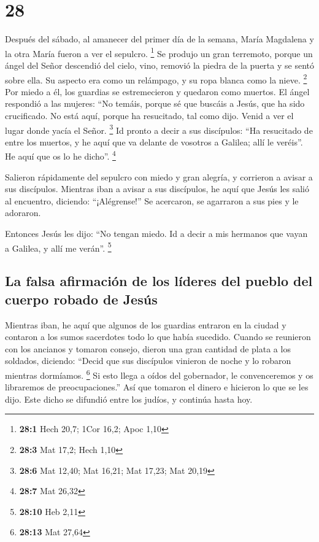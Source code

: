 \hypertarget{section-27}{%
\section{28}\label{section-27}}

 Después del sábado, al amanecer del primer día de la
semana, María Magdalena y la otra María fueron a ver el sepulcro.
\footnote{\textbf{28:1} Hech 20,7; 1Cor 16,2; Apoc 1,10} 
Se produjo un gran terremoto, porque un ángel del Señor descendió del
cielo, vino, removió la piedra de la puerta y se sentó sobre ella.
 Su aspecto era como un relámpago, y su ropa blanca como
la nieve. \footnote{\textbf{28:3} Mat 17,2; Hech 1,10} 
Por miedo a él, los guardias se estremecieron y quedaron como muertos.
 El ángel respondió a las mujeres: ``No temáis, porque sé
que buscáis a Jesús, que ha sido crucificado.  No está
aquí, porque ha resucitado, tal como dijo. Venid a ver el lugar donde
yacía el Señor. \footnote{\textbf{28:6} Mat 12,40; Mat 16,21; Mat 17,23;
  Mat 20,19}  Id pronto a decir a sus discípulos: ``Ha
resucitado de entre los muertos, y he aquí que va delante de vosotros a
Galilea; allí le veréis''. He aquí que os lo he dicho''. \footnote{\textbf{28:7}
  Mat 26,32}

 Salieron rápidamente del sepulcro con miedo y gran
alegría, y corrieron a avisar a sus discípulos.  Mientras
iban a avisar a sus discípulos, he aquí que Jesús les salió al
encuentro, diciendo: ``¡Alégrense!'' Se acercaron, se agarraron a sus
pies y le adoraron.

 Entonces Jesús les dijo: ``No tengan miedo. Id a decir a
mis hermanos que vayan a Galilea, y allí me verán''. \footnote{\textbf{28:10}
  Heb 2,11}

\hypertarget{la-falsa-afirmaciuxf3n-de-los-luxedderes-del-pueblo-del-cuerpo-robado-de-jesuxfas}{%
\subsection{La falsa afirmación de los líderes del pueblo del cuerpo
robado de
Jesús}\label{la-falsa-afirmaciuxf3n-de-los-luxedderes-del-pueblo-del-cuerpo-robado-de-jesuxfas}}

 Mientras iban, he aquí que algunos de los guardias
entraron en la ciudad y contaron a los sumos sacerdotes todo lo que
había sucedido.  Cuando se reunieron con los ancianos y
tomaron consejo, dieron una gran cantidad de plata a los soldados,
 diciendo: ``Decid que sus discípulos vinieron de noche y
lo robaron mientras dormíamos. \footnote{\textbf{28:13} Mat 27,64}
 Si esto llega a oídos del gobernador, le convenceremos y
os libraremos de preocupaciones.''  Así que tomaron el
dinero e hicieron lo que se les dijo. Este dicho se difundió entre los
judíos, y continúa hasta hoy.

